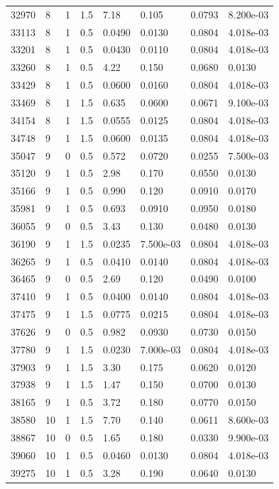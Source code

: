 \documentclass[preview]{standalone}
\begin{document}
{{{{\begin{tabular}{L{1.2cm}C{1.2cm} C{0.3cm}C{0.5cm} C{1.4cm}C{1.4cm} C{1.4cm}C{1.4cm}}
  32970  &     8  & 1     & 1.5 &  7.18  & 0.105  & 0.0793 &  8.200e-03   \\ 
  33113  &     8  & 1     & 0.5 &  0.0490  & 0.0130  & 0.0804 &  4.018e-03   \\ 
  33201  &     8  & 1     & 0.5 &  0.0430  & 0.0110  & 0.0804 &  4.018e-03   \\ 
  33260  &     8  & 1     & 0.5 &  4.22  & 0.150  & 0.0680 &  0.0130   \\ 
  33429  &     8  & 1     & 0.5 &  0.0600  & 0.0160  & 0.0804 &  4.018e-03   \\ 
  33469  &     8  & 1     & 1.5 &  0.635  & 0.0600  & 0.0671 &  9.100e-03   \\ 
  34154  &     8  & 1     & 1.5 &  0.0555  & 0.0125  & 0.0804 &  4.018e-03   \\ 
  34748  &     9  & 1     & 1.5 &  0.0600  & 0.0135  & 0.0804 &  4.018e-03   \\ 
  35047  &     9  & 0     & 0.5 &  0.572  & 0.0720  & 0.0255 &  7.500e-03   \\ 
  35120  &     9  & 1     & 0.5 &  2.98  & 0.170  & 0.0550 &  0.0130   \\ 
  35166  &     9  & 1     & 0.5 &  0.990  & 0.120  & 0.0910 &  0.0170   \\ 
  35981  &     9  & 1     & 0.5 &  0.693  & 0.0910  & 0.0950 &  0.0180   \\ 
  36055  &     9  & 0     & 0.5 &  3.43  & 0.130  & 0.0480 &  0.0130   \\ 
  36190  &     9  & 1     & 1.5 &  0.0235  & 7.500e-03  & 0.0804 &  4.018e-03   \\ 
  36265  &     9  & 1     & 0.5 &  0.0410  & 0.0140  & 0.0804 &  4.018e-03   \\ 
  36465  &     9  & 0     & 0.5 &  2.69  & 0.120  & 0.0490 &  0.0100   \\ 
  37410  &     9  & 1     & 0.5 &  0.0400  & 0.0140  & 0.0804 &  4.018e-03   \\ 
  37475  &     9  & 1     & 1.5 &  0.0775  & 0.0215  & 0.0804 &  4.018e-03   \\ 
  37626  &     9  & 0     & 0.5 &  0.982  & 0.0930  & 0.0730 &  0.0150   \\ 
  37780  &     9  & 1     & 1.5 &  0.0230  & 7.000e-03  & 0.0804 &  4.018e-03   \\ 
  37903  &     9  & 1     & 1.5 &  3.30  & 0.175  & 0.0620 &  0.0120   \\ 
  37938  &     9  & 1     & 1.5 &  1.47  & 0.150  & 0.0700 &  0.0130   \\ 
  38165  &     9  & 1     & 0.5 &  3.72  & 0.180  & 0.0770 &  0.0150   \\ 
  38580  &    10  & 1     & 1.5 &  7.70  & 0.140  & 0.0611 &  8.600e-03   \\ 
  38867  &    10  & 0     & 0.5 &  1.65  & 0.180  & 0.0330 &  9.900e-03   \\ 
  39060  &    10  & 1     & 0.5 &  0.0460  & 0.0130  & 0.0804 &  4.018e-03   \\ 
  39275  &    10  & 1     & 0.5 &  3.28  & 0.190  & 0.0640 &  0.0130   \\ 
\hline 
\end{tabular} 

}}}}
\end{document}

